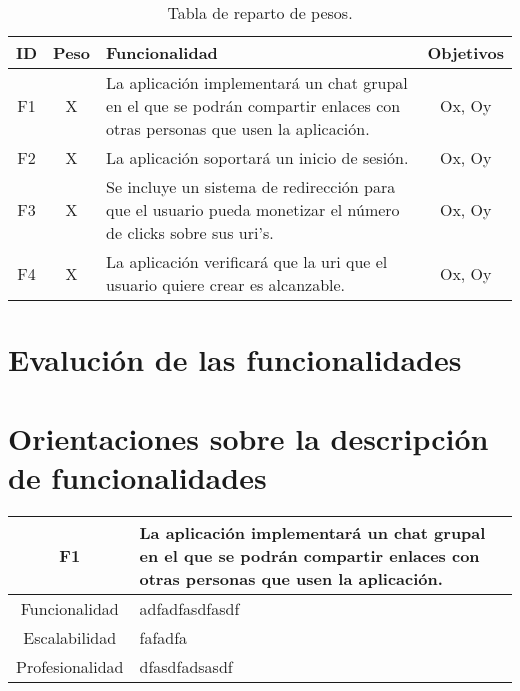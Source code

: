 \documentclass{article}
\begin{document}

\begin{table}[hbtp]
    \footnotesize
    \centering
    \settowidth{}
    \setlength\extrarowheight{5pt}
    \begin{tabulary}{\textwidth}{ C C L C}
        \textbf{ID} & 
        \textbf{Peso} & 
        \textbf{Funcionalidad} & 
        \textbf{Objetivos}\\
    \hline
    \hline
        F1 & 
        X & 
        La aplicación implementará un chat grupal en el que se podrán compartir enlaces con otras personas que usen la aplicación. &
        Ox, Oy\\
    \hline  
        F2 &
        X &
        La aplicación soportará un inicio de sesión. &
        Ox, Oy\\
    \hline
        F3 &
        X &
        Se incluye un sistema de redirección para que el usuario pueda monetizar el número de clicks sobre sus uri's. &
        Ox, Oy\\
    \hline
        F4 &
        X &
        La aplicación verificará que la uri que el usuario quiere crear es alcanzable. &
        Ox, Oy

    \end{tabulary}
    \caption{Tabla de reparto de pesos.}
\end{table}

\section*{Evalución de las funcionalidades}
\section*{Orientaciones sobre la descripción de funcionalidades}


\pagebreak

\begin{table}[hbtp]
    \footnotesize
    \centering
    \settowidth{}
    \setlength\extrarowheight{5pt}
    \begin{tabulary}{\textwidth}{ C L }
        \textbf{F1} & La aplicación implementará un chat grupal en el que se podrán compartir enlaces con otras personas que usen la aplicación.
        \\
    \hline
    
    Funcionalidad & adfadfasdfasdf\\
        
    Escalabilidad & fafadfa \\

    Profesionalidad & dfasdfadsasdf \\

    \end{tabulary}
\end{table}
\end{document}
